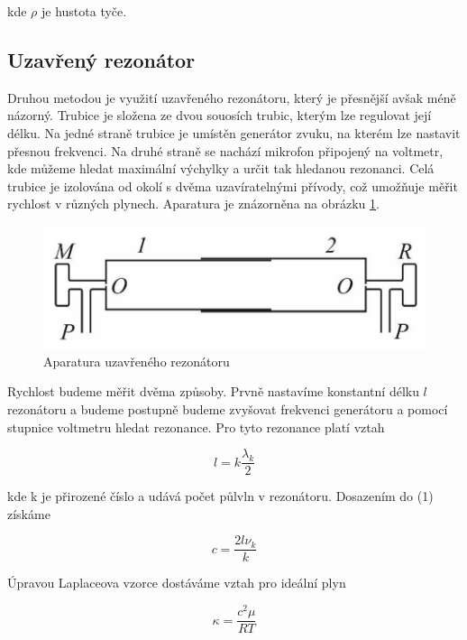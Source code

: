 kde \(\rho\) je hustota tyče.

\subsection{Uzavřený rezonátor}

Druhou metodou je využití uzavřeného rezonátoru, který je přesnější avšak méně názorný. Trubice je složena ze dvou souosích trubic, kterým lze regulovat její délku.
Na jedné straně trubice je umístěn generátor zvuku, na kterém lze nastavit přesnou frekvenci. Na druhé straně se nachází mikrofon připojený na voltmetr, kde můžeme hledat maximální výchylky a určit tak hledanou rezonanci. Celá trubice je izolována od okolí s dvěma uzavíratelnými přívody, což umožňuje měřit rychlost v různých plynech. Aparatura je znázorněna na obrázku \ref{fig:uzavreny-rezonator}.

\begin{figure}[h]
    \centering
    \includegraphics[width=0.6\linewidth]{10 - Rychlost šíření zvuku//Protokol//img/Aparatura uzavřeného rezonátoru.png}
    \caption{Aparatura uzavřeného rezonátoru}
    \label{fig:uzavreny-rezonator}
\end{figure}

Rychlost budeme měřit dvěma způsoby. Prvně nastavíme konstantní délku \(l\) rezonátoru a budeme postupně budeme zvyšovat frekvenci generátoru a pomocí stupnice voltmetru hledat rezonance. Pro tyto rezonance platí vztah

\begin{equation}
    l = k \frac{\lambda_k}{2}
\end{equation}

kde k je přirozené číslo a udává počet půlvln v rezonátoru. Dosazením do (1) získáme

\begin{equation}
    c = \frac{2l \nu_k}{k}
\end{equation}

Úpravou Laplaceova vzorce dostáváme vztah pro ideální plyn

\begin{equation}
    \kappa = \frac{c^2 \mu}{RT}
\end{equation}

